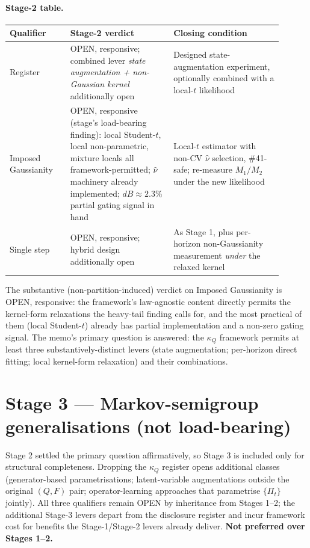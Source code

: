 \documentclass[11pt]{article}
\newcommand{\kQ}{\kappa_{Q}}
\newcommand{\nuhat}{\hat\nu}
\begin{document}
\paragraph{Stage-2 table.}
\begin{center}\small
\begin{tabular}{P{0.20\linewidth} P{0.34\linewidth} P{0.36\linewidth}}
\toprule
Qualifier & Stage-2 verdict & Closing condition \\
\midrule
Register
& OPEN, responsive; combined lever \emph{state augmentation +
non-Gaussian kernel} additionally open
& Designed state-augmentation experiment, optionally combined with
a local-\(t\) likelihood \\
\midrule
Imposed Gaussianity
& OPEN, responsive (stage's load-bearing finding): local
Student-\(t\), local non-parametric, mixture locals all
framework-permitted; \(\nuhat\) machinery already implemented;
\(dB \approx 2.3\%\) partial gating signal in hand
& Local-\(t\) estimator with non-CV \(\nuhat\) selection,
\#41-safe; re-measure \(M_1/M_2\) under the new likelihood \\
\midrule
Single step
& OPEN, responsive; hybrid design additionally open
& As Stage 1, plus per-horizon non-Gaussianity measurement
\emph{under} the relaxed kernel \\
\bottomrule
\end{tabular}
\end{center}

The substantive (non-partition-induced) verdict on Imposed
Gaussianity is OPEN, responsive: the framework's law-agnostic
content directly permits the kernel-form relaxations the heavy-tail
finding calls for, and the most practical of them (local
Student-\(t\)) already has partial implementation and a non-zero
gating signal. The memo's primary question is answered: the \(\kQ\)
framework permits at least three substantively-distinct levers
(state augmentation; per-horizon direct fitting; local kernel-form
relaxation) and their combinations.

\section{Stage 3 --- Markov-semigroup generalisations (not load-bearing)}
\label{sec:stage3}

Stage 2 settled the primary question affirmatively, so Stage 3 is
included only for structural completeness. Dropping the \(\kQ\)
register opens additional classes (generator-based parametrisations;
latent-variable augmentations outside the original \((Q, F)\) pair;
operator-learning approaches that parametrise \(\{\Pi_t\}\)
jointly). All three qualifiers remain OPEN by inheritance from
Stages 1--2; the additional Stage-3 levers depart from the disclosure
register and incur framework cost for benefits the Stage-1/Stage-2
levers already deliver. \textbf{Not preferred over Stages 1--2.}
\end{document}
